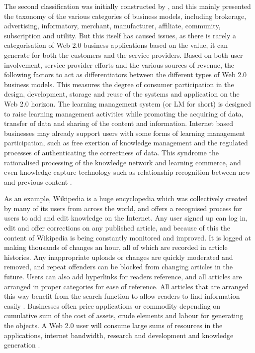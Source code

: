 The second classification was initially constructed by \cite{24}, and this mainly presented the taxonomy of the various categories of business models, including brokerage, advertising, informatory, merchant, manufacturer, affiliate, community, subscription and utility. But this itself has caused issues, as there is rarely a categorisation of Web 2.0 business applications based on the value, it can generate for both the customers and the service providers. Based on both user involvement, service provider efforts and the various sources of revenue, the following factors to act as differentiators between the different types of Web 2.0 business models. This measures the degree of consumer participation in the design, development, storage and reuse of the systems and application on the Web 2.0 horizon. The learning management system (or LM for short) is designed to raise learning management activities while promoting the acquiring of data, transfer of data and sharing of the content and information. Internet based businesses may already support users with some forms of learning management participation, such as free exertion of knowledge management and the regulated processes of authenticating the correctness of data. This syndrome the rationalised processing of the knowledge network and learning commerce, and even knowledge capture technology such as relationship recognition between new and previous content \cite{sclater2008web}.

As an example, Wikipedia is a huge encyclopedia which was collectively created by many of its users from across the world, and offers a recognised process for users to add and edit knowledge on the Internet. Any user signed up can log in, edit and offer corrections on any published article, and because of this the content of Wikipedia is being constantly monitored and improved. It is logged at making thousands of changes an hour, all of which are recorded in article histories. Any inappropriate uploads or changes are quickly moderated and removed, and repeat offenders can be blocked from changing articles in the future. Users can also add hyperlinks for readers reference, and all articles are arranged in proper categories for ease of reference. All articles that are arranged this way benefit from the search function to allow readers to find information easily \cite{aghaei2012evolution}. Businesses often price applications or commodity depending on cumulative sum of the cost of assets, crude elements and labour for generating the objects. A Web 2.0 user will consume large sums of resources in the applications, internet bandwidth, research and development and knowledge generation \cite{shang2011understanding}.

